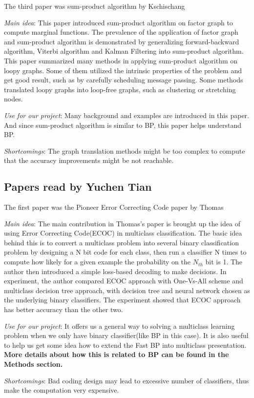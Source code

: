 The third paper was sum-product algorithm by Kschischang
\cite{Kschischang98factorgraphs}
\begin{itemize*}
\item {\em Main idea}:
This paper introduced sum-product algorithm on factor graph to compute marginal functions.
The prevalence of the application of factor graph and sum-product algorithm is demonstrated by generalizing forward-backward algorithm, Viterbi algorithm and Kalman Filtering into sum-product algorithm.
This paper summarized many methods in applying sum-product algorithm on loopy graphs. Some of them utilized the intrinsic properties of the problem and get good result, such as by carefully scheduling message passing. Some methods translated loopy graphs into loop-free graphs, such as clustering or stretching nodes.

\item {\em Use for our project}:
Many background and examples are introduced in this paper. And since sum-product algorithm is similar to BP, this paper helps understand BP.

\item {\em Shortcomings}:
The graph translation methods might be too complex to compute that the accuracy improvements might be not reachable.
\end{itemize*}

\subsection{Papers read by Yuchen Tian}
The first paper was the Pioneer Error Correcting Code paper by Thomas\cite{Thomas1995}
\begin{itemize*}
\item {\em Main idea}: The main contribution in Thomas's paper is brought up the idea of using Error Correcting Code(ECOC) in multiclass classification. The basic idea behind this is to convert a multiclass problem into several binary classification problem by designing a N bit code for each class, then run a classifier N times to compute how likely for a given example the probability on the $N_{th}$ bit is 1. The author then introduced a simple loss-based decoding to make decisions. In experiment, the author compared ECOC approach with One-Vs-All scheme and multiclass decision tree approach, with decision tree and neural network chosen as the underlying binary classifiers. The experiment showed that ECOC approach has better accuracy than the other two.
\item {\em Use for our project}:
It offers us a general way to solving a multiclass learning problem when we only have binary classifier(like BP in this case). It is also useful to help us get some idea how to extend the Fast BP into multiclass presentation. \textbf{More details about how this is related to BP can be found in the Methods section.}
\item {\em Shortcomings}:
Bad coding design may lead to excessive number of classifiers, thus make the computation very expensive.
\end{itemize*}

